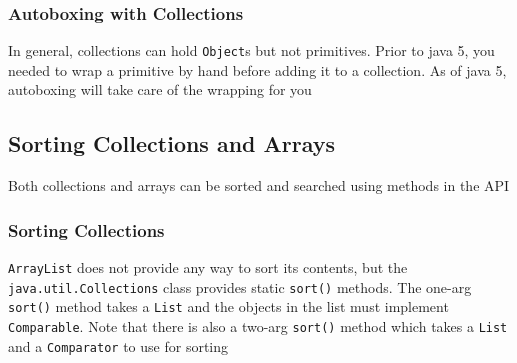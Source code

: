 \subsubsection{Autoboxing with Collections}
In general, collections can hold \verb#Object#s but not primitives. Prior to 
java 5, you needed to wrap a primitive by hand before adding it to a 
collection. As of java 5, autoboxing will take care of the wrapping for you

\subsection{Sorting Collections and Arrays}
Both collections and arrays can be sorted and searched using methods in the API

\subsubsection{Sorting Collections}
\verb#ArrayList# does not provide any way to sort its contents, but the 
\verb#java.util.Collections# class provides static \verb#sort()# methods. The 
one-arg \verb#sort()# method takes a \verb#List# and the objects in the list 
must implement \verb#Comparable#. Note that there is also a two-arg 
\verb#sort()# method which takes a \verb#List# and a \verb#Comparator# to use 
for sorting

